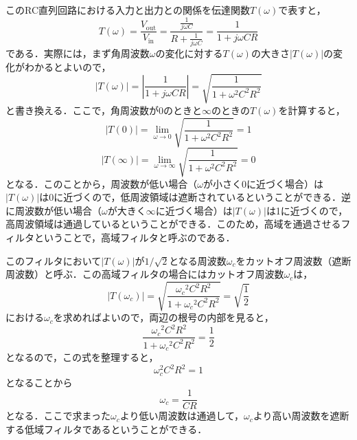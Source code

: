 このRC直列回路における入力と出力との関係を伝達関数$T(\omega)$で表すと，
\begin{equation}
T(\omega)  =  \frac{V_\textrm{out}}{V_\textrm{in}} 
 = \frac{\displaystyle \frac{1}{j\omega C}}{\displaystyle R + \frac{1}{j\omega C}} 
 = \frac{1}{1 + j\omega CR}
\end{equation}
である．実際には，まず角周波数$\omega$の変化に対する$T(\omega)$の大きさ$|T(\omega)|$の変化がわかるとよいので，
\begin{equation}
|T(\omega)| = \left | \frac{1}{1 + j\omega CR} \right | 
 =  \displaystyle \sqrt{\frac{1}{1 + \omega^2 C^2 R^2}}
\end{equation}
と書き換える．ここで，角周波数が0のときと$\infty$のときの$T(\omega)$を計算すると，
\begin{equation}
|T(0)| = \lim_{\omega \rightarrow 0} \displaystyle \sqrt{\frac{1}{1 + \omega^2 C^2 R^2}}  =  1
\end{equation}
\begin{equation}
|T(\infty)|  =  \lim_{\omega \rightarrow \infty}\displaystyle \sqrt{\frac{1}{1 + \omega^2 C^2 R^2}}  =  0
\end{equation}
となる．このことから，周波数が低い場合（$\omega$が小さく0に近づく場合）は$|T(\omega)|$は0に近づくので，低周波領域は遮断されているということができる．逆に周波数が低い場合（$\omega$が大きく$\infty$に近づく場合）は$|T(\omega)|$は1に近づくので，高周波領域は通過しているということができる．このため，高域を通過させるフィルタということで，高域フィルタと呼ぶのである．

このフィルタにおいて$|T(\omega)|$が$1/\sqrt{2}$となる周波数$\omega_c$をカットオフ周波数（遮断周波数）と呼ぶ．この高域フィルタの場合にはカットオフ周波数$\omega_c$は，
\begin{equation}
|T(\omega_c)|  = \displaystyle \sqrt{\frac{{\omega_c}^2 C^2 R^2}{1 + {\omega_c}^2 C^2 R^2}}  =  \sqrt{\frac{1}{2}}
\end{equation}
における$\omega_c$を求めればよいので，両辺の根号の内部を見ると，
\begin{equation}
\frac{{\omega_c}^2 C^2 R^2}{1 + {\omega_c}^2 C^2 R^2}  =  \frac{1}{2}
\end{equation}
となるので，この式を整理すると，
\begin{equation}
\omega_c^2 C^2 R^2 = 1
\end{equation}
となることから
\begin{equation}
\omega_c = \frac{1}{CR}
\end{equation}
となる．ここで求まった$\omega_c$より低い周波数は通過して，$\omega_c$より高い周波数を遮断する低域フィルタであるということができる．

